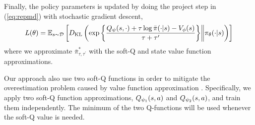Finally, the policy parameters is updated by doing the project step in (\ref{eq:repmd}) with stochastic gradient descent,
\begin{equation}
\label{eq:trainpi}
L(\theta) = \mathbb{E}_{s \sim {\mathcal{D}}} \left[ D_{\mathrm{KL}} \left( \exp\left\{ \frac{Q_{\psi}(s,\cdot) + \tau \log \bar{\pi}(\cdot|s) - V_{\phi}(s)}{\tau+\tau'} \right\} \middle\Vert \pi_{\theta}(\cdot |s) \right) \right]
\end{equation}
where we approximate $\bar{\pi}_{\tau,\tau^{\prime}}^*$ with the soft-Q and state value function approximations. 

Our approach also use two soft-Q functions in order to mitigate the overestimation problem caused by value function approximation \citep{haarnoja2018soft,fujimoto2018addressing}. Specifically, we apply two soft-Q function approximations, $Q_{\psi_1}(s,a)$ and $Q_{\psi_2}(s,a)$, and train them independently.  The minimum of the two Q-functions will be used whenever the soft-Q value is needed. 















